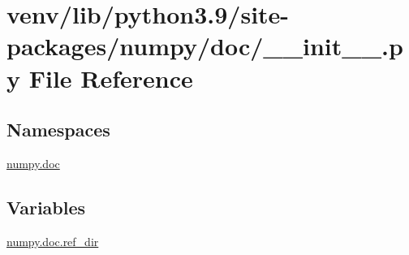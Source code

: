 \hypertarget{venv_2lib_2python3_89_2site-packages_2numpy_2doc_2____init_____8py}{}\section{venv/lib/python3.9/site-\/packages/numpy/doc/\+\_\+\+\_\+init\+\_\+\+\_\+.py File Reference}
\label{venv_2lib_2python3_89_2site-packages_2numpy_2doc_2____init_____8py}
\subsection*{Namespaces}
\begin{DoxyCompactItemize}
\item 
 \hyperlink{namespacenumpy_1_1doc}{numpy.\+doc}
\end{DoxyCompactItemize}
\subsection*{Variables}
\begin{DoxyCompactItemize}
\item 
\hyperlink{namespacenumpy_1_1doc_af7cf8e271b3994bd09a814cee01350e7}{numpy.\+doc.\+ref\+\_\+dir}
\end{DoxyCompactItemize}
